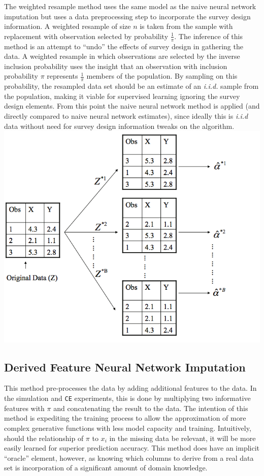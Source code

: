 \documentclass[12pt,twoside]{reedthesis}
\begin{document}
The weighted resample method uses the same model as the naive neural
network imputation but uses a data preprocessing step to incorporate the
survey design information. A weighted resample of size \(n\) is taken
from the sample with replacement with observation selected by
probability \(\frac{1}{\pi}\). The inference of this method is an
attempt to ``undo'' the effects of survey design in gathering the data.
A weighted resample in which observations are selected by the inverse
inclusion probability uses the insight that an observation with
inclusion probability \(\pi\) represents \(\frac{1}{\pi}\) members of
the population. By sampling on this probability, the resampled data set
should be an estimate of an \emph{i.i.d.} sample from the population,
making it viable for supervised learning ignoring the survey design
elements. From this point the naive neural network method is applied
(and directly compared to naive neural network estimates), since ideally
this is \emph{i.i.d} data without need for survey design information
tweaks on the algorithm. \includegraphics{figure/bs.png}

\subsection{Derived Feature Neural Network
Imputation}\label{derived-feature-neural-network-imputation}

This method pre-processes the data by adding additional features to the
data. In the simulation and \texttt{CE} experiments, this is done by
multiplying two informative features with \(\pi\) and concatenating the
result to the data. The intention of this method is expediting the
training process to allow the approximation of more complex generative
functions with less model capacity and training. Intuitively, should the
relationship of \(\pi\) to \(x_i\) in the missing data be relevant, it
will be more easily learned for superior prediction accuracy. This
method does have an implicit ``oracle'' element, however, as knowing
which columns to derive from a real data set is incorporation of a
significant amount of domain knowledge.
\end{document}
